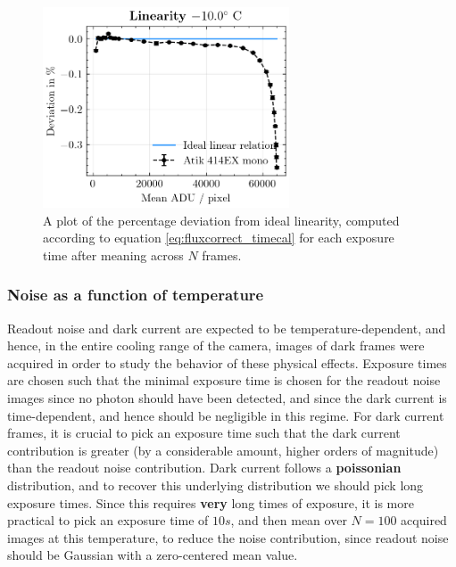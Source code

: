 \documentclass[../main.tex]{subfiles}
\begin{document}
		\begin{figure}
			\centering			\includegraphics[width=0.65\textwidth]{linearity.png}
			\caption{A plot of the percentage deviation from ideal linearity, computed according to equation  \ref{eq:fluxcorrect_timecal} for each exposure time after meaning across $N$ frames. }
			\label{fig:linearity}
		\end{figure}
		
		\subsubsection{Noise as a function of temperature}
		Readout noise and dark current are expected to be temperature-dependent, and hence, in the entire cooling range of the camera,  images of dark frames were acquired in order to study the behavior of these physical effects. Exposure times are chosen such that the minimal exposure time is chosen for the readout noise images since no photon should have been detected, and since the dark current is time-dependent, and hence should be negligible in this regime. For dark current frames, it is crucial to pick an exposure time such that the dark current contribution is greater (by a considerable amount, higher orders of magnitude) than the readout noise contribution. Dark current follows a \textbf{poissonian} distribution, and to recover this underlying distribution we should pick long exposure times. Since this requires \textbf{very} long times of exposure, it is more practical to pick an exposure time of $10s$, and then mean over $N = 100$ acquired images at this temperature, to reduce the noise contribution, since readout noise should be Gaussian with a zero-centered mean value. 
		
\end{document}
